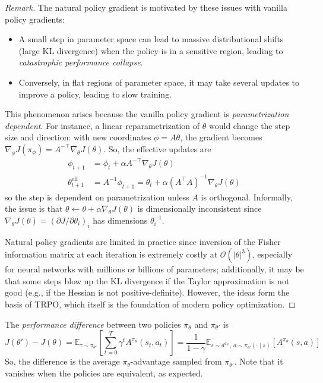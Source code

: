 \documentclass[11pt, letterpaper]{article}
\newenvironment{remark}
    {\renewcommand\qedsymbol{\(\blacksquare\)}\begin{proof}[Remark]}
    {\end{proof}}
\begin{document}
\begin{remark}
    The natural policy gradient is motivated by these issues with vanilla policy gradients: 
    \begin{itemize}
        \item A small step in parameter space can lead to massive distributional shifts (large KL divergence) when the policy is in a sensitive region, leading to \textit{catastrophic performance collapse}. 
        \item Conversely, in flat regions of parameter space, it may take several updates to improve a policy, leading to slow training. 
    \end{itemize}
    This phenomenon arises because the vanilla policy gradient is \textit{parametrization dependent}. For instance, a linear reparametrization of \(\theta\) would change the step size and direction: with new coordinates \(\phi = A\theta\), the gradient becomes \(\nabla_\phi J(\pi_\phi) = A^{-\top} \nabla_\theta J(\theta)\). So, the effective updates are
    \begin{align*}
        \phi_{t+1} &= \phi_t + \alpha A^{-\top} \nabla_\theta J(\theta) \\
        \theta_{t+1}^{\text{eff}} &= A^{-1} \phi_{t+1} = \theta_t + \alpha (A^\top A)^{-1} \nabla_\theta J(\theta)
    \end{align*}
    so the step is dependent on parametrization unless \(A\) is orthogonal. Informally, the issue is that \(\theta \leftarrow \theta + \alpha \nabla_\theta J(\theta)\) is dimensionally inconsistent since \(\nabla_\theta J(\theta) = (\partial J / \partial \theta_i)_i\) has dimensions \(\theta_i^{-1}\). 

    Natural policy gradients are limited in practice since inversion of the Fisher information matrix at each iteration is extremely costly at \(\mathcal{O}(|\theta|^3)\), especially for neural networks with millions or billions of parameters; additionally, it may be that some steps blow up the KL divergence if the Taylor approximation is not good (e.g., if the Hessian is not positive-definite). However, the ideas form the basis of TRPO, which itself is the foundation of modern policy optimization. 
\end{remark}

\begin{concept}
    The \textit{performance difference} between two policies \(\pi_\theta\) and \(\pi_{\theta'}\) is
    \[
        J(\theta') - J(\theta) 
        = \mathbb{E}_{\tau \sim \pi_{\theta'}}\left[ \sum_{t=0}^T \gamma^t A^{\pi_\theta}(s_t, a_t) \right]
        = \frac{1}{1 - \gamma} \mathbb{E}_{s \sim d^{\pi_{\theta'}},\, a \sim \pi_{\theta'}(\cdot \mid s)}[ A^{\pi_\theta}(s, a)]
    \]
    So, the difference is the average \(\pi_\theta\)-advantage sampled from \(\pi_{\theta'}\). Note that it vanishes when the policies are equivalent, as expected. 
\end{concept}
\end{document}
